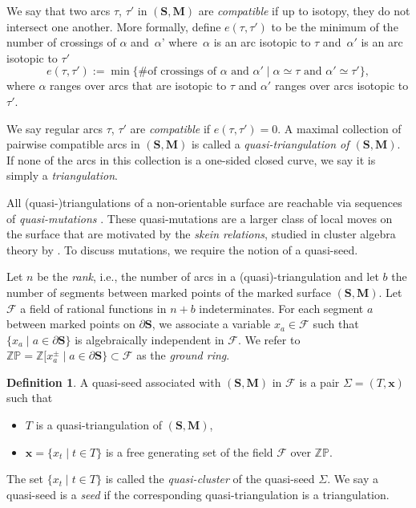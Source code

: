 \documentclass[10pt,a4paper]{amsart}
\numberwithin{equation}{section}
\theoremstyle{definition}
\newtheorem{Definition}[Theorem]{Definition}
\newcommand{\SM}{(\mathbf{S}, \mathbf{M})}
\begin{document}
We say that two arcs $\tau$, $\tau'$ in $\SM$ are \textit{compatible} if up to isotopy, they do not intersect one another. More formally, define $e(\tau, \tau')$ to be the minimum of the number of crossings of $\alpha$ and~$\alpha$' where~$\alpha$ is an arc isotopic to $\tau$ and~$\alpha'$ is an arc isotopic to $\tau'$
\[e(\tau, \tau') := \min\{\# \text{of crossings of } \alpha \text{ and } \alpha' \mid \alpha \simeq \tau \text{ and } \alpha' \simeq \tau'\},\]
\noindent where $\alpha$ ranges over arcs that are isotopic to $\tau$ and $\alpha'$ ranges over arcs isotopic to $\tau'$.

We say regular arcs $\tau$, $\tau'$ are \textit{compatible} if $e(\tau, \tau') = 0$. A maximal collection of pairwise compatible arcs in $\SM$ is called a \textit{quasi-triangulation of $\SM$}. If none of the arcs in this collection is a one-sided closed curve, we say it is simply a \textit{triangulation}.

All (quasi-)triangulations of a non-orientable surface are reachable via sequences of \textit{quasi-mutations} \cite[Proposition 3.12]{DP15}. These quasi-mutations are a larger class of local moves on the surface that are motivated by the \textit{skein relations}, studied in cluster algebra theory by \cite{FST08, MW13}. To discuss mutations, we require the notion of a quasi-seed.

Let $n$ be the \textit{rank}, i.e., the number of arcs in a (quasi)-triangulation and let $b$ the number of segments between marked points of the marked surface $(\mathbf{S}, \mathbf{M})$. Let $\mathcal{F}$ a field of rational functions in $n+b$ indeterminates. For each segment $a$ between marked points on $\partial \mathbf{S}$, we associate a variable $x_a\in \mathcal{F}$ such that $\{x_a\mid a\in\partial\mathbf{S}\}$ is algebraically independent in $\mathcal{F}$. We refer to~${\mathbb{Z}\mathbb{P}=\mathbb{Z}\big[x_a^{\pm} \mid a\in\partial\mathbf{S}\big\}\subset\mathcal{F}}$ as the \textit{ground ring}.

\begin{Definition}\label{definition:quasiseed}
 A quasi-seed associated with $(\mathbf{S}, \mathbf{M})$ in $\mathcal{F}$ is a pair $\Sigma=(T, \mathbf{x})$ such that
 \begin{itemize}\itemsep=0pt
 \item $T$ is a quasi-triangulation of $(\mathbf{S},\mathbf{M})$,
 \item $\mathbf{x}=\{x_t \mid t\in T\}$ is a free generating set of the field $\mathcal{F}$ over $\mathbb{Z}\mathbb{P}$.
 \end{itemize}
 The set $\{x_t \mid t\in T\}$ is called the \textit{quasi-cluster} of the quasi-seed $\Sigma$. We say a quasi-seed is a \textit{seed} if the corresponding quasi-triangulation is a triangulation.
\end{Definition}
\end{document}
